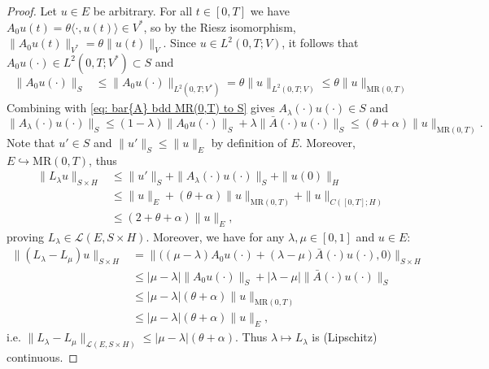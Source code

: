 \documentclass{amsart}
\renewcommand{\MR}{\mathrm{MR}}
\newcommand{\<}{\langle}
\newcommand{\?}{\rangle}
\newcommand{\into}{\hookrightarrow}
\theoremstyle{plain}
\theoremstyle{remark}
\theoremstyle{plain}
\numberwithin{equation}{section}
\begin{document}
\begin{proof}
Let $u\in E$ be arbitrary. For all $t\in[0,T]$ we have $A_0u(t)=\theta\<\cdot,u(t)\?\in V^*$, so by the Riesz isomorphism, $\|A_0u(t)\|_{V^*}=\theta\|u(t)\|_V$. Since $u\in L^2(0,T;V)$, it follows that $A_0u(\cdot)\in L^2(0,T;V^*)\subset S$ and
\begin{align*}
\|{A}_0 u(\cdot)\|_S&\leq \|{A}_0 u(\cdot)\|_{L^2(0,T;V^*)}
=\theta\| u\|_{L^2(0,T;V)}\leq \theta\| u\|_{\MR(0,T)}
\end{align*}
Combining with \eqref{eq: bar{A} bdd MR(0,T) to S} gives ${A}_\lambda(\cdot)u(\cdot)\in S$ and
\begin{equation}\label{eq: est A_lambda}
\|{A}_\lambda(\cdot)u(\cdot)\|_S\leq (1-\lambda)\|A_0u(\cdot)\|_S+\lambda\|\bar{A}(\cdot)u(\cdot)\|_S\leq ( \theta+ \alpha)\|u\|_{\MR(0,T)}.
\end{equation}
Note that $u'\in S$ and $\|u'\|_S\leq\|u\|_E$ by definition of $E$. Moreover, $E\into \MR(0,T)$, thus
\begin{align*}
\|L_\lambda u\|_{S\times H}&\leq \|u'\|_S+\|{A}_\lambda(\cdot)u(\cdot)\|_S+\|u(0)\|_H\\
&\leq \|u\|_E+( \theta+ \alpha)\|u\|_{\MR(0,T)}+\|u\|_{C([0,T];H)}\\
&\leq (2+\theta+\alpha)\|u\|_E,
\end{align*}
proving $L_\lambda\in \mathcal{L}(E,S\times H)$. Moreover, we have for any $\lambda,\mu\in [0,1]$ and $u\in E$:
\begin{align*}
\|(L_\lambda-L_\mu) u\|_{S\times H}&=\|\big((\mu-\lambda)A_0u(\cdot)+(\lambda-\mu)\bar{A}(\cdot)u(\cdot),0\big)\|_{S\times H}\\
&\leq |\mu-\lambda|\|A_0u(\cdot)\|_S+|\lambda-\mu|\|\bar{A}(\cdot)u(\cdot)\|_S\\
&\leq |\mu-\lambda|(\theta+\alpha)\|u\|_{\MR(0,T)}\\
&\leq |\mu-\lambda|(\theta+\alpha)\|u\|_E,
\end{align*}
i.e. $\|L_\lambda-L_\mu\|_{\mathcal{L}(E,S\times H)}\leq |\mu-\lambda|(\theta+\alpha)$. Thus $\lambda\mapsto L_\lambda$ is (Lipschitz) continuous.


\end{proof}
\end{document}
